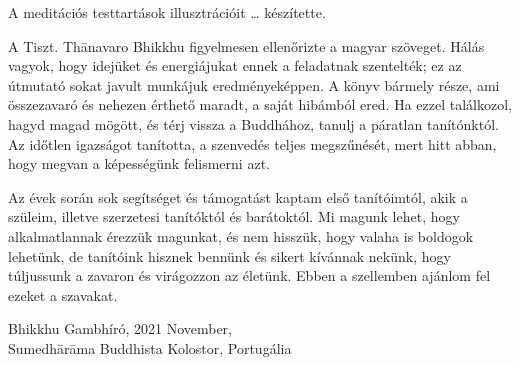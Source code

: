 A meditációs testtartások illusztrációit \ldots{} készítette.

A Tiszt. Thānavaro Bhikkhu figyelmesen ellenőrizte a magyar szöveget.
Hálás vagyok, hogy idejüket és energiájukat ennek a feladatnak
szentelték; ez az útmutató sokat javult munkájuk eredményeképpen. A
könyv bármely része, ami összezavaró és nehezen érthető maradt, a saját
hibámból ered. Ha ezzel találkozol, hagyd magad mögött, és térj vissza a
Buddhához, tanulj a páratlan tanítónktól. Az időtlen igazságot
tanította, a szenvedés teljes megszűnését, mert hitt abban, hogy megvan
a képességünk felismerni azt.

Az évek során sok segítséget és támogatást kaptam első tanítóimtól, akik
a szüleim, illetve szerzetesi tanítóktól és barátoktól. Mi magunk lehet,
hogy alkalmatlannak érezzük magunkat, és nem hisszük, hogy valaha is
boldogok lehetünk, de tanítóink hisznek bennünk és sikert kívánnak
nekünk, hogy túljussunk a zavaron és virágozzon az életünk. Ebben a
szellemben ajánlom fel ezeket a szavakat.

\bigskip

\enlargethispage*{2\baselineskip}

{\raggedleft
Bhikkhu Gambhíró,
2021 November,\\
Sumedhārāma Buddhista Kolostor, Portugália
\par}
